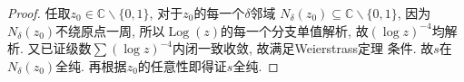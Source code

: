 \documentclass[a4paper, 12pt]{ctexart}
\theoremstyle{plain}
\theoremstyle{plain}
\theoremstyle{plain}
\theoremstyle{nonumberplain}
\newtheorem{proof}{Proof}
\DeclareMathOperator{\Log}{Log}
\begin{document}
    \begin{proof}
        任取$z_{0}\in\mathbb{C}\backslash\{0, 1\}$,
        对于$z_{0}$的每一个$\delta$邻域
        $N_{\delta}(z_{0})\subseteq\mathbb{C}\backslash\{0, 1\}$,
        因为$N_{\delta}(z_{0})$不绕原点一周,
        所以$\Log(z)$的每一个分支单值解析,
        故$(\log{z})^{-4}$均解析.
        又已证级数$\sum{(\log{z})^{-4}}$内闭一致收敛, 故满足Weierstrass定理
        条件. 故$s$在$N_{\delta}(z_{0})$全纯. 再根据$z_{0}$的任意性即得证$s$全纯.
    \end{proof}


\end{document}

